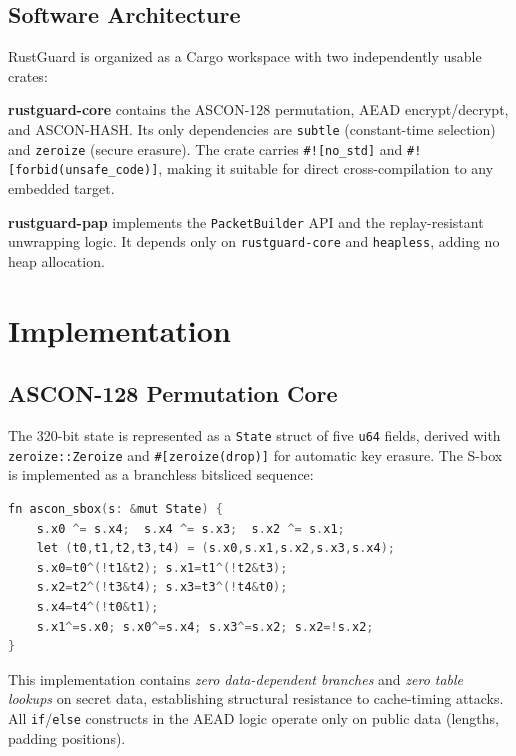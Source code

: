 \documentclass[conference]{IEEEtran}
\begin{document}
\subsection{Software Architecture}

RustGuard is organized as a Cargo workspace with two independently usable crates:

\noindent\textbf{rustguard-core} contains the ASCON-128 permutation, AEAD
encrypt/decrypt, and ASCON-HASH. Its only dependencies are \texttt{subtle}
(constant-time selection) and \texttt{zeroize} (secure erasure). The crate
carries \texttt{\#![no\_std]} and \texttt{\#![forbid(unsafe\_code)]}, making
it suitable for direct cross-compilation to any embedded target.

\noindent\textbf{rustguard-pap} implements the \texttt{PacketBuilder} API and
the replay-resistant unwrapping logic. It depends only on
\texttt{rustguard-core} and \texttt{heapless}, adding no heap allocation.

\section{Implementation}
\label{sec:impl}

\subsection{ASCON-128 Permutation Core}

The 320-bit state is represented as a \texttt{State} struct of five
\texttt{u64} fields, derived with \texttt{zeroize::Zeroize} and
\texttt{\#[zeroize(drop)]} for automatic key erasure. The S-box is
implemented as a branchless bitsliced sequence:

\begin{lstlisting}[language=C,caption={Bitsliced ASCON S-box (\texttt{rustguard-core/src/lib.rs}).}]
fn ascon_sbox(s: &mut State) {
    s.x0 ^= s.x4;  s.x4 ^= s.x3;  s.x2 ^= s.x1;
    let (t0,t1,t2,t3,t4) = (s.x0,s.x1,s.x2,s.x3,s.x4);
    s.x0=t0^(!t1&t2); s.x1=t1^(!t2&t3);
    s.x2=t2^(!t3&t4); s.x3=t3^(!t4&t0);
    s.x4=t4^(!t0&t1);
    s.x1^=s.x0; s.x0^=s.x4; s.x3^=s.x2; s.x2=!s.x2;
}
\end{lstlisting}

This implementation contains \emph{zero data-dependent branches} and
\emph{zero table lookups} on secret data, establishing structural resistance
to cache-timing attacks. All \texttt{if}/\texttt{else} constructs in the AEAD
logic operate only on public data (lengths, padding positions).
\end{document}
